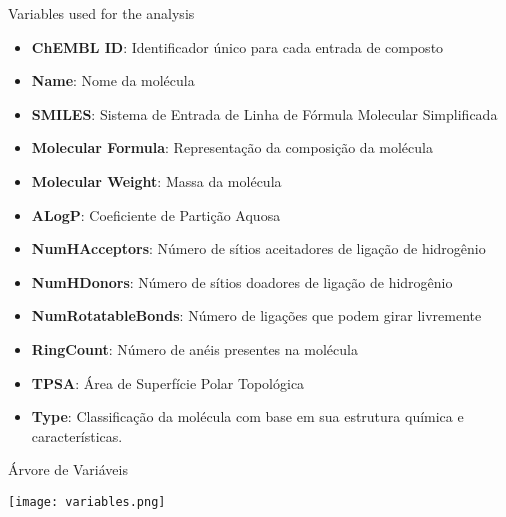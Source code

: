 \documentclass[8pt]{beamer}
\begin{document}
\begin{frame}{Variables used for the analysis}
  \begin{itemize}
    \item \textbf{ChEMBL ID}: Identificador único para cada entrada de composto
    \item \textbf{Name}: Nome da molécula
    \item \textbf{SMILES}: Sistema de Entrada de Linha de Fórmula Molecular Simplificada
    \item \textbf{Molecular Formula}: Representação da composição da molécula
    \item \textbf{Molecular Weight}: Massa da molécula
    \item \textbf{ALogP}: Coeficiente de Partição Aquosa
    \item \textbf{NumHAcceptors}: Número de sítios aceitadores de ligação de hidrogênio
    \item \textbf{NumHDonors}: Número de sítios doadores de ligação de hidrogênio
    \item \textbf{NumRotatableBonds}: Número de ligações que podem girar livremente
    \item \textbf{RingCount}: Número de anéis presentes na molécula
    \item \textbf{TPSA}: Área de Superfície Polar Topológica
    \item \textbf{Type}: Classificação da molécula com base em sua estrutura química e características.
  \end{itemize}
\end{frame}

\begin{frame}{Árvore de Variáveis}
  \begin{center}
    \texttt{[image: variables.png]}
  \end{center}
\end{frame}
\end{document}
